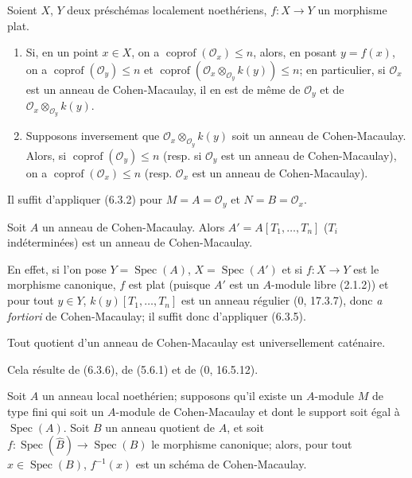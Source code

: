 \begin{corollary}[6.3.5]
\label{IV.2.s6.3.5-fr}
Soient $X$, $Y$ deux préschémas localement noethériens, $f:X\to Y$ un
morphisme plat.
\begin{enumerate}
\item[(i)] Si, en un point $x\in X$, on a
$\operatorname{coprof}(\mathcal O_x)\leq n$, alors, en posant $y=f(x)$, on a
$\operatorname{coprof}(\mathcal O_y)\leq n$ et
$\operatorname{coprof}(\mathcal O_x\otimes_{\mathcal O_y}k(y))\leq n$; en
particulier, si $\mathcal O_x$ est un anneau de Cohen-Macaulay, il en est de
même de $\mathcal O_y$ et de
$\mathcal O_x\otimes_{\mathcal O_y}k(y)$.
\item[(ii)] Supposons inversement que
$\mathcal O_x\otimes_{\mathcal O_y}k(y)$ soit un anneau de Cohen-Macaulay.
Alors, si $\operatorname{coprof}(\mathcal O_y)\leq n$ (resp. si
$\mathcal O_y$ est un anneau de Cohen-Macaulay), on a
$\operatorname{coprof}(\mathcal O_x)\leq n$ (resp. $\mathcal O_x$ est un
anneau de Cohen-Macaulay).
\end{enumerate}
\end{corollary}

Il suffit d'appliquer (6.3.2) pour $M=A=\mathcal O_y$ et
$N=B=\mathcal O_x$.

\begin{corollary}[6.3.6]
\label{IV.2.s6.3.6-fr}
Soit $A$ un anneau de Cohen-Macaulay. Alors
$A'=A[T_1,\ldots,T_n]$ ($T_i$ indéterminées) est un anneau de
Cohen-Macaulay.
\end{corollary}

En effet, si l'on pose $Y=\operatorname{Spec}(A)$,
$X=\operatorname{Spec}(A')$ et si $f:X\to Y$ est le morphisme canonique, $f$
est plat (puisque $A'$ est un $A$-module libre (2.1.2)) et pour tout $y\in Y$,
$k(y)[T_1,\ldots,T_n]$ est un anneau régulier (0, 17.3.7), donc \emph{a
fortiori} de Cohen-Macaulay; il suffit donc d'appliquer (6.3.5).

\begin{corollary}[6.3.7]
\label{IV.2.s6.3.7-fr}
Tout quotient d'un anneau de Cohen-Macaulay est universellement caténaire.
\end{corollary}

Cela résulte de (6.3.6), de (5.6.1) et de (0, 16.5.12).

\begin{proposition}[6.3.8]
\label{IV.2.s6.3.8-fr}
Soit $A$ un anneau local noethérien; supposons qu'il existe un $A$-module $M$
de type fini qui soit un $A$-module de Cohen-Macaulay et dont le support soit
égal à $\operatorname{Spec}(A)$. Soit $B$ un anneau quotient de $A$, et soit
$f:\operatorname{Spec}(\widehat B)\to\operatorname{Spec}(B)$ le morphisme
canonique; alors, pour tout $x\in\operatorname{Spec}(B)$, $f^{-1}(x)$ est un
schéma de Cohen-Macaulay.
\end{proposition}

